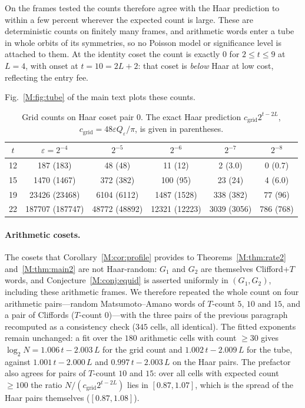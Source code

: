 \documentclass[aps,prx,twocolumn,superscriptaddress,nofootinbib,longbibliography]{revtex4-2}
\theoremstyle{plain}
\theoremstyle{definition}
\theoremstyle{remark}
\begin{document}
On the frames tested the counts therefore agree with the Haar prediction to within a few percent wherever the expected count is large. These are deterministic counts on finitely many frames, and arithmetic words enter a tube in whole orbits of its symmetries, so no Poisson model or significance level is attached to them. At the identity coset the count is exactly $0$ for $2\le t\le9$ at $L=4$, with onset at $t=10=2L+2$: that coset is \emph{below} Haar at low cost, reflecting the entry fee.

Fig.~\ref{M:fig:tube} of the main text plots these counts.

\begin{table}[t]
\centering\scriptsize
\caption{Grid counts on Haar coset pair 0. The exact Haar prediction $c_{\mathrm{grid}}2^{t-2L}$, $c_{\mathrm{grid}}=48\varepsilon Q_\varepsilon/\pi$, is given in parentheses.}
\label{tab:counts}
\setlength{\tabcolsep}{1pt}\begin{tabular}{@{}c ccccc@{}}
\toprule
$t$ & $\varepsilon=2^{-4}$ & $2^{-5}$ & $2^{-6}$ & $2^{-7}$ & $2^{-8}$\\
\midrule
12 & 187 (183) & 48 (48) & 11 (12) & 2 (3.0) & 0 (0.7)\\
15 & 1470 (1467) & 372 (382) & 100 (95) & 23 (24) & 4 (6.0)\\
19 & 23426 (23468) & 6104 (6112) & 1487 (1528) & 338 (382) & 77 (96)\\
22 & 187707 (187747) & 48772 (48892) & 12321 (12223) & 3039 (3056) & 786 (768)\\
\bottomrule
\end{tabular}
\end{table}

\paragraph{Arithmetic cosets.} The cosets that Corollary~\ref{M:cor:profile} provides to Theorems~\ref{M:thm:rate2} and~\ref{M:thm:main2} are not Haar-random: $G_1$ and $G_2$ are themselves Clifford+$T$ words, and Conjecture~\ref{M:conj:equid} is asserted uniformly in $(G_1,G_2)$, including these arithmetic frames. We therefore repeated the whole count on four arithmetic pairs---random Matsumoto--Amano words of $T$-count $5$, $10$ and $15$, and a pair of Cliffords ($T$-count $0$)---with the three pairs of the previous paragraph recomputed as a consistency check ($345$ cells, all identical). The fitted exponents remain unchanged: a fit over the $180$ arithmetic cells with count $\ge30$ gives $\log_2N=1.006\,t-2.003\,L$ for the grid count and $1.002\,t-2.009\,L$ for the tube, against $1.001\,t-2.000\,L$ and $0.997\,t-2.003\,L$ on the Haar pairs. The prefactor also agrees for pairs of $T$-count $10$ and $15$: over all cells with expected count $\ge100$ the ratio $N/(c_{\mathrm{grid}}2^{t-2L})$ lies in $[0.87,1.07]$, which is the spread of the Haar pairs themselves ($[0.87,1.08]$). 
\end{document}
